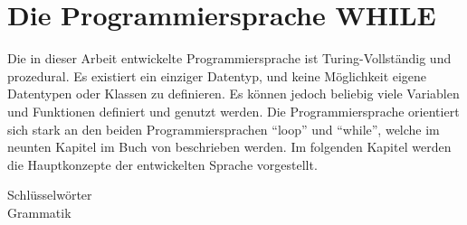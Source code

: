\chapter{Die Programmiersprache WHILE}

Die in dieser Arbeit entwickelte Programmiersprache ist Turing-Vollständig und prozedural. Es existiert ein einziger Datentyp, und keine Möglichkeit eigene Datentypen oder Klassen zu definieren. Es können jedoch beliebig viele Variablen und Funktionen definiert und genutzt werden. Die Programmiersprache orientiert sich stark an den beiden Programmiersprachen \enquote{loop} und \enquote{while}, welche im neunten Kapitel im Buch  von \citeauthor{GottfriedVossen2016} beschrieben werden. \cite{GottfriedVossen2016} Im folgenden Kapitel werden die Hauptkonzepte der entwickelten Sprache vorgestellt.


Schlüsselwörter\\
Grammatik\\